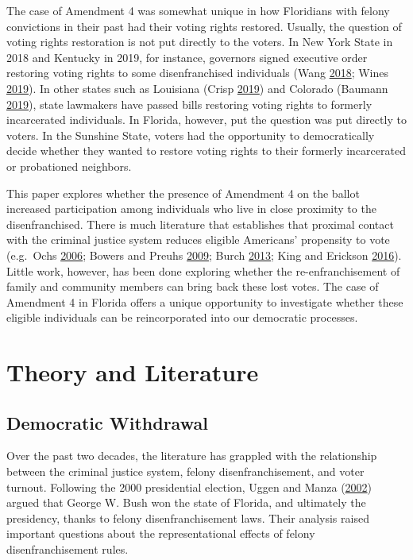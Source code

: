 \documentclass[
  12pt,
]{article}
\begin{document}
The case of Amendment 4 was somewhat unique in how Floridians with felony convictions in their past had their voting rights restored. Usually, the question of voting rights restoration is not put directly to the voters. In New York State in 2018 and Kentucky in 2019, for instance, governors signed executive order restoring voting rights to some disenfranchised individuals (Wang \protect\hyperlink{ref-Wang2018}{2018}; Wines \protect\hyperlink{ref-Wines2019}{2019}). In other states such as Louisiana (Crisp \protect\hyperlink{ref-Crisp2019}{2019}) and Colorado (Baumann \protect\hyperlink{ref-Baumann2019}{2019}), state lawmakers have passed bills restoring voting rights to formerly incarcerated individuals. In Florida, however, put the question was put directly to voters. In the Sunshine State, voters had the opportunity to democratically decide whether they wanted to restore voting rights to their formerly incarcerated or probationed neighbors.

This paper explores whether the presence of Amendment 4 on the ballot increased participation among individuals who live in close proximity to the disenfranchised. There is much literature that establishes that proximal contact with the criminal justice system reduces eligible Americans' propensity to vote (e.g.~Ochs \protect\hyperlink{ref-Ochs2006}{2006}; Bowers and Preuhs \protect\hyperlink{ref-Bowers2009}{2009}; Burch \protect\hyperlink{ref-Burch2013}{2013}; King and Erickson \protect\hyperlink{ref-King2016}{2016}). Little work, however, has been done exploring whether the re-enfranchisement of family and community members can bring back these lost votes. The case of Amendment 4 in Florida offers a unique opportunity to investigate whether these eligible individuals can be reincorporated into our democratic processes.

\hypertarget{theory-and-literature}{%
\section*{Theory and Literature}\label{theory-and-literature}}

\hypertarget{democratic-withdrawal}{%
\subsection*{Democratic Withdrawal}\label{democratic-withdrawal}}

Over the past two decades, the literature has grappled with the relationship between the criminal justice system, felony disenfranchisement, and voter turnout. Following the 2000 presidential election, Uggen and Manza (\protect\hyperlink{ref-Uggen2002}{2002}) argued that George W. Bush won the state of Florida, and ultimately the presidency, thanks to felony disenfranchisement laws. Their analysis raised important questions about the representational effects of felony disenfranchisement rules.
\end{document}
